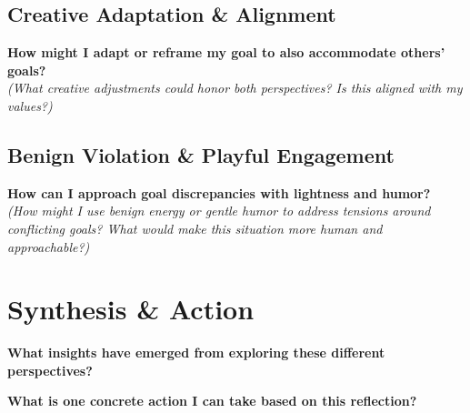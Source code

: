 \documentclass[11pt,a4paper]{article}
\begin{document}
\subsection{Creative Adaptation \& Alignment}

\noindent\textbf{How might I adapt or reframe my goal to also accommodate others' goals?}\\
\textit{(What creative adjustments could honor both perspectives? Is this aligned with my values?)}
\begin{answerbox}
\vspace{3em}
\end{answerbox}

\subsection{Benign Violation \& Playful Engagement}

\noindent\textbf{How can I approach goal discrepancies with lightness and humor?}\\
\textit{(How might I use benign energy or gentle humor to address tensions around conflicting goals? What would make this situation more human and approachable?)}
\begin{answerbox}
\vspace{3em}
\end{answerbox}

\section{Synthesis \& Action}

\noindent\textbf{What insights have emerged from exploring these different perspectives?}
\begin{answerbox}
\vspace{3em}
\end{answerbox}

\noindent\textbf{What is one concrete action I can take based on this reflection?}
\begin{answerbox}
\vspace{3em}
\end{answerbox}
\end{document}
